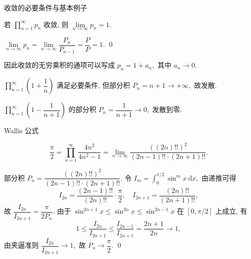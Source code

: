 \begin{frame}{收敛的必要条件与基本例子}

\begin{thm}[收敛的必要条件]
若 $\prod\limits_{n=1}^\infty p_n$ 收敛, 则 $\lim\limits_{n \to \infty} p_n = 1.$
\end{thm}

\startproof[bg=yellow, fg=red]
$\lim\limits_{n \to \infty} p_n = \lim\limits_{n \to \infty} \dfrac{P_n}{P_{n-1}} = \dfrac{P}{P} = 1.$
\qed

\pause
\vspace{0.5em}

因此收敛的无穷乘积的通项可以写成 $p_n = 1 + a_n,$ 其中 $a_n \to 0.$

\pause
\vspace{0.5em}

\begin{eg}
$\prod\limits_{n=1}^\infty \left(1 + \dfrac{1}{n}\right)$ 满足必要条件, 但部分积 $P_n = n + 1 \to +\infty,$ 故发散.

$\prod\limits_{n=1}^\infty \left(1 - \dfrac{1}{n+1}\right)$ 的部分积 $P_n = \dfrac{1}{n+1} \to 0,$ 发散到零.
\end{eg}

\end{frame}


\begin{frame}{Wallis 公式}

\begin{thm}[Wallis 公式, 1655]
\[
\frac{\pi}{2} = \prod_{n=1}^\infty \frac{4n^2}{4n^2 - 1} = \lim_{n \to \infty} \frac{((2n)!!)^2}{(2n-1)!! \cdot (2n+1)!!}.
\]
\end{thm}

\startproof[bg=yellow, fg=red]
部分积 $P_n = \dfrac{((2n)!!)^2}{(2n-1)!! \cdot (2n+1)!!}.$ 令 $\displaystyle I_m = \int_0^{\pi/2} \sin^m x ~ \mathrm{d}x,$ 由递推可得
\[
I_{2n} = \frac{(2n-1)!!}{(2n)!!} \cdot \frac{\pi}{2}, \quad I_{2n+1} = \frac{(2n)!!}{(2n+1)!!},
\]
故 $\dfrac{I_{2n}}{I_{2n+1}} = \dfrac{\pi}{2P_n}.$ 由于 $\sin^{2n+1} x \leqslant \sin^{2n} x \leqslant \sin^{2n-1} x$ 在 $[0, \pi/2]$ 上成立, 有
\[
1 \leqslant \frac{I_{2n}}{I_{2n+1}} \leqslant \frac{I_{2n-1}}{I_{2n+1}} = \frac{2n+1}{2n} \to 1,
\]
由夹逼准则 $\dfrac{I_{2n}}{I_{2n+1}} \to 1,$ 故 $P_n \to \dfrac{\pi}{2}.$
\qed

\end{frame}


